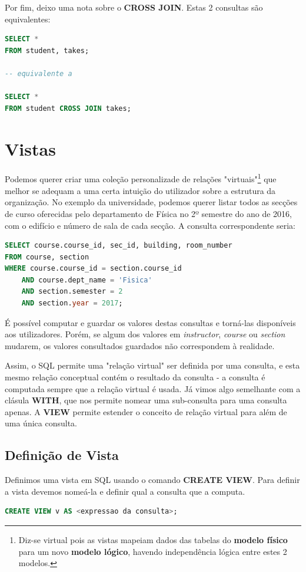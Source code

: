 \documentclass[oneside]{book}
\theoremstyle{definition}
\begin{document}
Por fim, deixo uma nota sobre o \textbf{CROSS JOIN}. Estas 2 consultas são equivalentes:
\begin{lstlisting}[language=SQL, morekeywords={REFERENCES, REFRESH, MATERIALIZED, CONCURRENTLY}, framesep=8pt, xleftmargin=40pt, framexleftmargin=40pt, frame=tb, framerule=0pt]
SELECT *
FROM student, takes;

-- equivalente a

SELECT *
FROM student CROSS JOIN takes;
\end{lstlisting}

\section{Vistas}
Podemos querer criar uma coleção personalizade de relações "virtuais"\footnote{Diz-se virtual pois as vistas mapeiam dados das tabelas do \textbf{modelo físico} para um novo \textbf{modelo lógico}, havendo independência lógica entre estes 2 modelos.} que melhor se adequam a uma certa intuição do utilizador sobre a estrutura da organização. No exemplo da universidade, podemos querer listar todos as secções de curso oferecidas pelo departamento de Física no 2º semestre do ano de 2016, com o edifício e número de sala de cada secção. A consulta correspondente seria:
\begin{lstlisting}[language=SQL, morekeywords={REFERENCES, REFRESH, MATERIALIZED, CONCURRENTLY}, framesep=8pt, xleftmargin=40pt, framexleftmargin=40pt, frame=tb, framerule=0pt]
SELECT course.course_id, sec_id, building, room_number
FROM course, section
WHERE course.course_id = section.course_id
    AND course.dept_name = 'Fisica'
    AND section.semester = 2
    AND section.year = 2017;
\end{lstlisting}
É possível computar e guardar os valores destas consultas e torná-las disponíveis aos utilizadores. Porém, se algum dos valores em \textit{instructor}, \textit{course} ou \textit{section} mudarem, os valores consultados guardados não correspondem à realidade.

Assim, o SQL permite uma "relação virtual" ser definida por uma consulta, e esta mesmo relação conceptual contém o resultado da consulta - a consulta é computada sempre que a relação virtual é usada. Já vimos algo semelhante com a clásula \textbf{WITH}, que nos permite nomear uma sub-consulta para uma consulta apenas. A \textbf{VIEW} permite estender o conceito de relação virtual para além de uma única consulta.

\subsection{Definição de Vista}
Definimos uma vista em SQL usando o comando \textbf{CREATE VIEW}. Para definir a vista devemos nomeá-la e definir qual a consulta que a computa.
\begin{lstlisting}[language=SQL, morekeywords={REFERENCES, REFRESH, MATERIALIZED, CONCURRENTLY}, framesep=8pt, xleftmargin=40pt, framexleftmargin=40pt, frame=tb, framerule=0pt]
CREATE VIEW v AS <expressao da consulta>;
\end{lstlisting}
\end{document}
